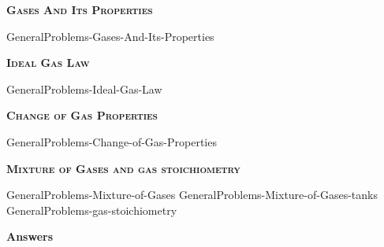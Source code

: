 \documentclass[main.tex]{subfiles}
\newcommand\chapterlabel{Ch-Gas}
\begin{document}
\newpage
\setdoublesep{0.35700 em}  %
\setatomsep{1.78500 em}    %
\setbondoffset{0.18265 em} %
\newcommand{\bondwidth}{0.06642 em} %
\setbondstyle{line width = \bondwidth}
\fancyhfoffset[E,O]{0pt}
\setlength{\columnsep}{30pt}
\begin{conclusion}
\end{conclusion}
\begin{multicols*}{2}\setcounter{numA}{1}

{\raggedright\textsc{\textbf{Gases And Its Properties }}\par}
{GeneralProblems-Gases-And-Its-Properties}

\iftoggle{chem121}{}{
{GeneralProblems-Measuring-pressure}
}

{\raggedright\textsc{\textbf{Ideal Gas Law }}\par}
{GeneralProblems-Ideal-Gas-Law }
{\raggedright\textsc{\textbf{Change of Gas Properties }}\par}
{GeneralProblems-Change-of-Gas-Properties}
{\raggedright\textsc{\textbf{Mixture of Gases and gas stoichiometry }}\par}
{GeneralProblems-Mixture-of-Gases}
{GeneralProblems-Mixture-of-Gases-tanks}
{GeneralProblems-gas-stoichiometry}
 
\iftoggle{chem121}{}{
{\raggedright\textsc{\textbf{Real gases and the kinetic molecular theory of gases }}\par}
{GeneralProblems-Real-gases-and-the-kinetic-molecular-theory-of-gases}
\clearpage\thispagestyle{empty}\mbox{}\clearpage

}

\end{multicols*}
\newpage
\begin{answersenvironment}
\begin{minipage}[c]{1\textwidth}
\begin{localsize}{10}
{\Large \bf Answers}
\printsolutions 
 
\end{localsize}
\end{minipage}\end{answersenvironment}
\end{document}
